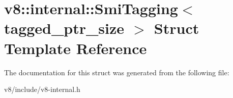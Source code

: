 \hypertarget{structv8_1_1internal_1_1SmiTagging}{}\section{v8\+:\+:internal\+:\+:Smi\+Tagging$<$ tagged\+\_\+ptr\+\_\+size $>$ Struct Template Reference}
\label{structv8_1_1internal_1_1SmiTagging}


The documentation for this struct was generated from the following file\+:\begin{DoxyCompactItemize}
\item 
v8/include/v8-\/internal.\+h\end{DoxyCompactItemize}
